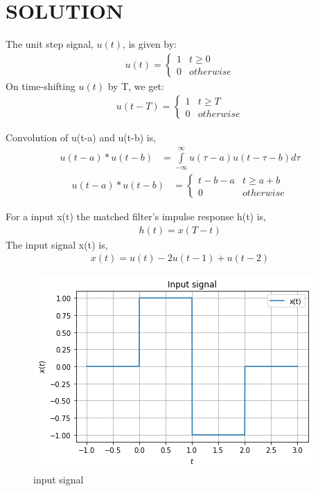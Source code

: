 \documentclass[journal,12pt,twocolumn]{IEEEtran}
\begin{document}
\section{SOLUTION}
\begin{lemma}
    The unit step signal, $u(t)$, is given by:
\begin{align}
    u(t) = 
    \begin{cases}
    1 & t\geq0\\
    0 & otherwise
    \end{cases}
    \label{u(t)}
\end{align}
On time-shifting $u(t)$ by T, we get:
\begin{align}
     u(t - T) =
    \begin{cases}
    1 & t\geq T\\
    0 & otherwise
    \end{cases}
    \label{u(t-T)}
\end{align}
\end{lemma}
\begin{lemma}
Convolution of u(t-a) and u(t-b) is,
\begin{align}
   \nonumber u(t-a)*u(t-b)&=\int\limits_{-\infty}^{\infty}u(\tau-a)u(t-\tau-b) d\tau
\end{align}
\begin{align}
   \nonumber u(t-a)*u(t-b)&= \begin{cases}
    t-b-a & t\geq a+b\\
    0 & otherwise
    \end{cases}
\end{align}
\label{convolve}
\end{lemma}
For a input x(t) the matched filter's impulse response h(t) is,
\begin{align}
    h(t) = x(T-t) \label{0}
\end{align}
The input signal x(t) is,
\begin{align}
    x(t) = u(t)-2u(t-1)+u(t-2)
\end{align}
 \begin{figure}[!htp]
\centering
 \includegraphics[width=\columnwidth]{input.png}
 \caption{input signal}
 \end{figure}
 
\end{document}
